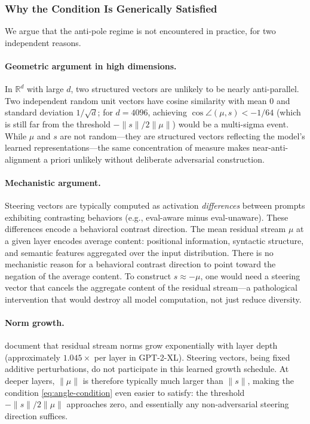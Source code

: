 \subsubsection{Why the Condition Is Generically Satisfied}
\label{sec:generic}

We argue that the anti-pole regime is not encountered in practice, for
two independent reasons.

\paragraph{Geometric argument in high dimensions.}
In $\mathbb{R}^d$ with large $d$, two structured vectors are unlikely to
be nearly anti-parallel.
Two independent random unit vectors have cosine similarity with mean $0$
and standard deviation $1/\sqrt{d}$; for $d = 4096$, achieving
$\cos\angle(\mu, s) < -1/64$ (which is still far from the threshold
$-\|s\|/2\|\mu\|$) would be a multi-sigma event.
While $\mu$ and $s$ are not random---they are structured vectors
reflecting the model's learned representations---the same concentration
of measure makes near-anti-alignment a priori unlikely without
deliberate adversarial construction.

\paragraph{Mechanistic argument.}
Steering vectors are typically computed as activation \emph{differences}
between prompts exhibiting contrasting behaviors
(e.g., eval-aware minus eval-unaware).
These differences encode a behavioral contrast direction.
The mean residual stream $\mu$ at a given layer encodes average content:
positional information, syntactic structure, and semantic features
aggregated over the input distribution.
There is no mechanistic reason for a behavioral contrast direction to
point toward the negation of the average content.
To construct $s \approx -\mu$, one would need a steering vector that
cancels the aggregate content of the residual stream---a pathological
intervention that would destroy all model computation, not just reduce
diversity.

\paragraph{Norm growth.}
\citet{turntrout2023norms} document that residual stream norms grow
exponentially with layer depth (approximately $1.045\times$ per layer
in GPT-2-XL).
Steering vectors, being fixed additive perturbations, do not participate
in this learned growth schedule.
At deeper layers, $\|\mu\|$ is therefore typically much larger than
$\|s\|$, making the condition \eqref{eq:angle-condition} even easier
to satisfy: the threshold $-\|s\|/2\|\mu\|$ approaches zero, and
essentially any non-adversarial steering direction suffices.

